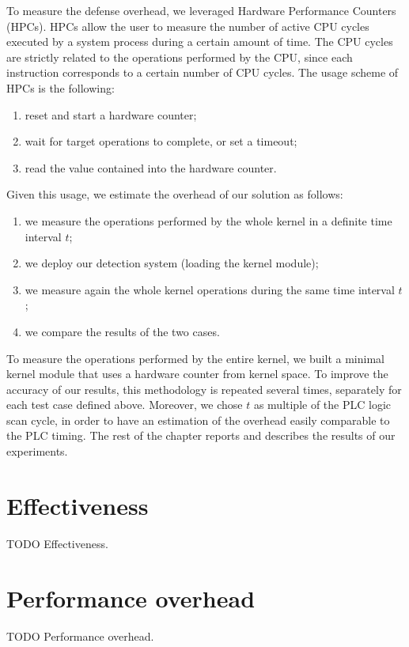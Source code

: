 To measure the defense overhead, we leveraged Hardware Performance Counters (HPCs).
HPCs allow the user to measure the number of active CPU cycles executed by a system process during a certain amount of time.
The CPU cycles are strictly related to the operations performed by the CPU, since each instruction corresponds to a certain number of CPU cycles.
The usage scheme of HPCs is the following:
\begin{enumerate}
	\item reset and start a hardware counter;
	\item wait for target operations to complete, or set a timeout;
	\item read the value contained into the hardware counter.
\end{enumerate}
Given this usage, we estimate the overhead of our solution as follows:
\begin{enumerate}
	\item we measure the operations performed by the whole kernel in a definite time interval $t$;
	\item we deploy our detection system (loading the kernel module);
	\item we measure again the whole kernel operations during the same time interval $t$;
	\item we compare the results of the two cases.
\end{enumerate}
To measure the operations performed by the entire kernel, we built a minimal kernel module that uses a hardware counter from kernel space.
To improve the accuracy of our results, this methodology is repeated several times, separately for each test case defined above.
Moreover, we chose $t$ as multiple of the PLC logic scan cycle, in order to have an estimation of the overhead easily comparable to the PLC timing.
The rest of the chapter reports and describes the results of our experiments.


\section{Effectiveness}

TODO Effectiveness.


\section{Performance overhead}

TODO Performance overhead.
